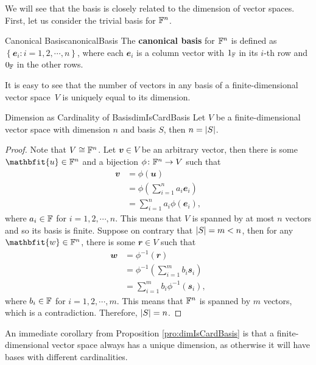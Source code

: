 \documentclass[math]{amznotes}
\theoremstyle{remark}
\begin{document}
We will see that the basis is closely related to the dimension of vector spaces. First, let us consider the trivial basis for $\mathbb{F}^n$.
\begin{dfnbox}{Canonical Basis}{canonicalBasis}
    The {\color{red} \textbf{canonical basis}} for $\mathbb{F}^n$ is defined as $\left\{\mathbfit{e}_i \colon i = 1, 2, \cdots, n\right\}$, where each $\mathbfit{e}_i$ is a column vector with $1_{\mathbb{F}}$ in its $i$-th row and $0_{\mathbb{F}}$ in the other rows.
\end{dfnbox}
It is easy to see that the number of vectors in any basis of a finite-dimensional vector space~$V$ is uniquely equal to its dimension.
\begin{probox}{Dimension as Cardinality of Basis}{dimIsCardBasis}
    Let $V$ be a finite-dimensional vector space with dimension $n$ and basis $S$, then $n = {\left\lvert {S} \right\rvert}$.
    \tcblower
    \begin{proof}
        Note that $V \cong \mathbb{F}^n$. Let $\mathbfit{v} \in V$ be an arbitrary vector, then there is some~$\mathbfit{u} \in \F^n$ and a bijection $\phi \colon \mathbb{F}^n \to V$ such that 
        \begin{align*}
            \mathbfit{v} & = \phi(\mathbfit{u}) \\
            & = \phi\left(\sum_{i = 1}^{n}a_i\mathbfit{e}_i\right) \\
            & = \sum_{i = 1}^{n}a_i\phi(\mathbfit{e}_i),
        \end{align*}
        where $a_i \in \mathbb{F}$ for $i = 1, 2, \cdots, n$. This means that $V$ is spanned by at most $n$ vectors and so its basis is finite. Suppose on contrary that ${\left\lvert {S} \right\rvert} = m < n$, then for any $\mathbfit{w} \in \F^n$, there is some $\mathbfit{r} \in V$ such that
        \begin{align*}
            \mathbfit{w} & = \phi^{-1}(\mathbfit{r}) \\
            & = \phi^{-1}\left(\sum_{i = 1}^{m}b_i\mathbfit{s}_i\right) \\
            & = \sum_{i = 1}^{m}b_i\phi^{-1}(\mathbfit{s}_i),
        \end{align*}
        where $b_i \in \mathbb{F}$ for $i = 1, 2, \cdots, m$. This means that $\mathbb{F}^n$ is spanned by $m$ vectors, which is a contradiction. Therefore, ${\left\lvert {S} \right\rvert} = n$.
    \end{proof}
\end{probox}
An immediate corollary from Proposition \ref{pro:dimIsCardBasis} is that a finite-dimensional vector space always has a unique dimension, as otherwise it will have bases with different cardinalities.
\end{document}
